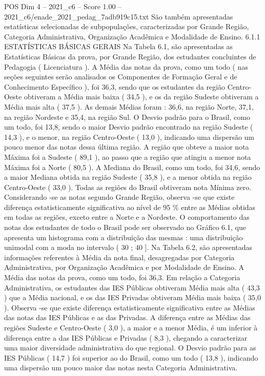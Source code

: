 \begin{textsample}{POS Dim 4 – 2021\_c6 – Score 1.00 – 2021\_c6/enade\_2021\_pedag\_7adb919c15.txt}
São também apresentadas estatísticas selecionadas de subpopulações, caracterizadas por Grande Região, Categoria Administrativa, Organização Acadêmica e Modalidade de Ensino. 6.1.1 ESTATÍSTICAS BÁSICAS GERAIS Na Tabela 6.1, são apresentadas as Estatísticas Básicas da prova, por Grande Região, dos estudantes concluintes de Pedagogia ( Licenciatura ).
A Média das notas da prova, como um todo ( nas seções seguintes serão analisados os Componentes de Formação Geral e de Conhecimento Específico ), foi 36,3, sendo que os estudantes da região Centro-Oeste obtiveram a Média mais baixa ( 34,5 ), e os da região Sudeste obtiveram a Média mais alta ( 37,5 ).
As demais Médias foram : 36,6, na região Norte, 37,1, na região Nordeste e 35,4, na região Sul.
O Desvio padrão para o Brasil, como um todo, foi 13,8, sendo o maior Desvio padrão encontrado na região Sudeste ( 14,3 ), e o menor, na região Centro-Oeste ( 13,0 ), indicando uma dispersão um pouco menor das notas dessa última região.
A região que obteve a maior nota Máxima foi a Sudeste ( 89,1 ), ao passo que a região que atingiu a menor nota Máxima foi a Norte ( 80,5 ).
A Mediana do Brasil, como um todo, foi 34,6, sendo a maior Mediana obtida na região Sudeste ( 35,8 ), e a menor obtida na região Centro-Oeste ( 33,0 ).
Todas as regiões do Brasil obtiveram nota Mínima zero.
Considerando -se as notas segundo Grande Região, observa -se que existe diferença estatisticamente significativa ao nível de 95 \% entre as Médias obtidas em todas as regiões, exceto entre a Norte e a Nordeste.
O comportamento das notas dos estudantes de todo o Brasil pode ser observado no Gráfico 6.1, que apresenta um histograma com a distribuição das mesmas : uma distribuição unimodal com a moda no intervalo ( 30 ; 40 ].
Na Tabela 6.2, são apresentadas informações referentes à Média da nota final, desagregadas por Categoria Administrativa, por Organização Acadêmica e por Modalidade de Ensino.
A Média das notas da prova, como um todo, foi 36,3.
Em relação a Categoria Administrativa, os estudantes das IES Públicas obtiveram Média mais alta ( 43,3 ) que a Média nacional, e os das IES Privadas obtiveram Média mais baixa ( 35,0 ).
Observa -se que existe diferença estatisticamente significativa entre as Médias das notas das IES Públicas e as das Privadas.
A diferença entre as Médias das regiões Sudeste e Centro-Oeste ( 3,0 ), a maior e a menor Média, é um inferior à diferença entre a das IES Públicas e Privadas ( 8,3 ), chegando a caracterizar uma maior diversidade administrativa do que regional.
O Desvio padrão para as IES Públicas ( 14,7 ) foi superior ao do Brasil, como um todo ( 13,8 ), indicando uma dispersão um pouco maior das notas nesta Categoria Administrativa.

\end{textsample}
